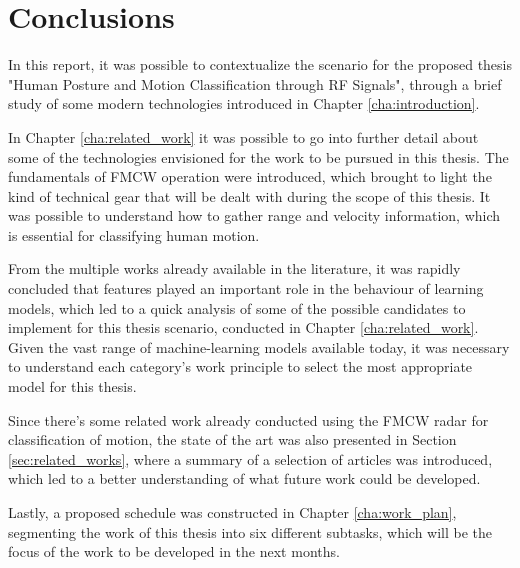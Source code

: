 
%

\chapter{Conclusions}
\label{cha:conclusions}

In this report, it was possible to contextualize the scenario for the proposed thesis "Human Posture and Motion Classification through RF Signals", through a brief study of some modern technologies introduced in Chapter \ref{cha:introduction}.

In Chapter \ref{cha:related_work} it was possible to go into further detail about some of the technologies envisioned for the work to be pursued in this thesis. The fundamentals of FMCW operation were introduced, which brought to light the kind of technical gear that will be dealt with during the scope of this thesis. It was possible to understand how to gather range and velocity information, which is essential for classifying human motion.

From the multiple works already available in the literature, it was rapidly concluded that features played an important role in the behaviour of learning models, which led to a quick analysis of some of the possible candidates to implement for this thesis scenario, conducted in Chapter \ref{cha:related_work}. 
Given the vast range of machine-learning models available today, it was necessary to understand each category's work principle to select the most appropriate model for this thesis. 

Since there's some related work already conducted using the FMCW radar for classification of motion, the state of the art was also presented in Section \ref{sec:related_works}, where a summary of a selection of articles was introduced, which led to a better understanding of what future work could be developed.

Lastly, a proposed schedule was constructed in Chapter \ref{cha:work_plan}, segmenting the work of this thesis into six different subtasks, which will be the focus of the work to be developed in the next months. 
